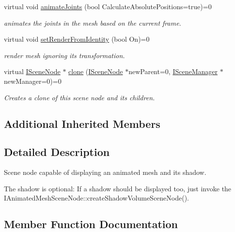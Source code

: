 \begin{DoxyCompactItemize}
virtual void \hyperlink{classirr_1_1scene_1_1IAnimatedMeshSceneNode_a76af2c9a2b0cea6ee2b3559c1f32f850}{animate\+Joints} (bool Calculate\+Absolute\+Positions=true)=0
\begin{DoxyCompactList}\small\item\em animates the joints in the mesh based on the current frame. \end{DoxyCompactList}\item 
virtual void \hyperlink{classirr_1_1scene_1_1IAnimatedMeshSceneNode_aa3aa695d2e949bbc2ff17429951e77d0}{set\+Render\+From\+Identity} (bool On)=0
\begin{DoxyCompactList}\small\item\em render mesh ignoring its transformation. \end{DoxyCompactList}\item 
virtual \hyperlink{classirr_1_1scene_1_1ISceneNode}{I\+Scene\+Node} $\ast$ \hyperlink{classirr_1_1scene_1_1IAnimatedMeshSceneNode_a47aabf6554e3f91bbb033edb8668cec8}{clone} (\hyperlink{classirr_1_1scene_1_1ISceneNode}{I\+Scene\+Node} $\ast$new\+Parent=0, \hyperlink{classirr_1_1scene_1_1ISceneManager}{I\+Scene\+Manager} $\ast$new\+Manager=0)=0
\begin{DoxyCompactList}\small\item\em Creates a clone of this scene node and its children. \end{DoxyCompactList}\end{DoxyCompactItemize}
\subsection*{Additional Inherited Members}


\subsection{Detailed Description}
Scene node capable of displaying an animated mesh and its shadow. 

The shadow is optional\+: If a shadow should be displayed too, just invoke the I\+Animated\+Mesh\+Scene\+Node\+::create\+Shadow\+Volume\+Scene\+Node(). 

\subsection{Member Function Documentation}
\mbox{\label{classirr_1_1scene_1_1IAnimatedMeshSceneNode_aaa4947ed5f7ba72870da37ee1fc17125}} 

